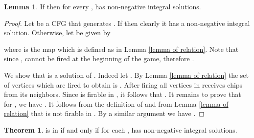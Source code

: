 \documentclass{article}
\theoremstyle{definition}
\newtheorem{lem}{Lemma}
\newtheorem{theo}{Theorem}
\begin{document}
\begin{lem}
\label{lemma of solution}
If  then for every ,   has non-negative integral solutions. 
\end{lem}
\begin{proof}

Let  be a CFG that generates . If  then clearly it has a non-negative integral solution. Otherwise, let  be given by
 
where  is the map which is defined as in Lemma \ref{lemma of relation}. Note that since ,  cannot be fired at the beginning of the game, therefore .

We show that  is a solution of . Indeed let . By Lemma \ref{lemma of relation} the set of vertices which are fired to obtain  is . After firing all vertices in   receives  chips from its neighbors. Since  is firable in , it follows that . It remains to prove that for , we have . It follows from the definition of  and from Lemma \ref{lemma of relation} that  is not firable in . By a similar argument we have .
\end{proof}
\begin{theo}
\label{the condition of lattices induced by CFG}
 is in  if and only if for each ,  has non-negative integral solutions.
\end{theo}
\end{document}
